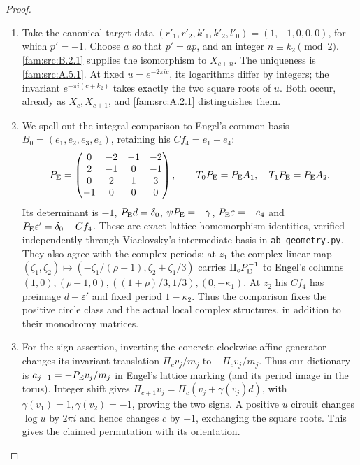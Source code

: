 \begin{proof}
\begin{enumerate}[label=\arabic*.,leftmargin=*]
\item Take the canonical target data $(r'_1,r'_2,k'_1,k'_2,l'_0)=(1,-1,0,0,0)$, for which $p'=-1$. Choose $a$ so that $p'=ap$, and an integer $n\equiv k_2\pmod2$. \ref{fam:src:B.2.1} supplies the isomorphism to $X_{c+n}$. The uniqueness is \ref{fam:src:A.5.1}. At fixed $u=e^{-2\pi ic}$, its logarithms differ by integers; the invariant $e^{-\pi i(c+k_2)}$ takes exactly the two square roots of $u$. Both occur, already as $X_c,X_{c+1}$, and \ref{fam:src:A.2.1} distinguishes them.

\item We spell out the integral comparison to Engel's common basis $B_0=(e_1,e_2,e_3,e_4)$, retaining his $C f_4=e_1+e_4$:
\[
 P_{\rm E}=\begin{pmatrix}0&-2&-1&-2\\2&-1&0&-1\\0&2&1&3\\-1&0&0&0\end{pmatrix},\qquad
 T_0P_{\rm E}=P_{\rm E}A_1,\quad T_1P_{\rm E}=P_{\rm E}A_2.
\]
Its determinant is $-1$, $P_{\rm E}d=\delta_0$, $\psi P_{\rm E}=-\gamma$, $P_{\rm E}\varepsilon=-e_4$ and $P_{\rm E}\varepsilon'=\delta_0-Cf_4$. These are exact lattice homomorphism identities, verified independently through Viaclovsky's intermediate basis in \texttt{ab\_geometry.py}. They also agree with the complex periods: at $z_1$ the complex-linear map
$(\zeta_1,\zeta_2)\mapsto(-\zeta_1/(\rho+1),\zeta_2+\zeta_1/3)$ carries $\Pi_cP_{\rm E}^{-1}$ to Engel's columns $(1,0),(\rho-1,0),((1+\rho)/3,1/3),(0,-\kappa_1)$. At $z_2$ his $Cf_4$ has preimage $d-\varepsilon'$ and fixed period $1-\kappa_2$. Thus the comparison fixes the positive circle class and the actual local complex structures, in addition to their monodromy matrices.

\item For the sign assertion, inverting the concrete clockwise affine generator changes its invariant translation $\Pi_cv_j/m_j$ to $-\Pi_cv_j/m_j$. Thus our dictionary is $a_{j-1}=-P_{\rm E}v_j/m_j$ in Engel's lattice marking (and its period image in the torus). Integer shift gives $\Pi_{c+1}v_j=\Pi_c(v_j+\gamma(v_j)d)$, with $\gamma(v_1)=1,\gamma(v_2)=-1$, proving the two signs. A positive $u$ circuit changes $\log u$ by $2\pi i$ and hence changes $c$ by $-1$, exchanging the square roots. This gives the claimed permutation with its orientation.
\end{enumerate}
\end{proof}

